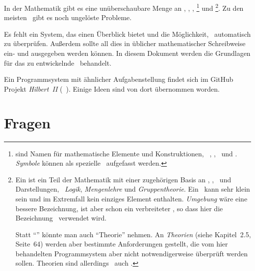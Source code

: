 In der Mathematik gibt es eine unüberschaubare Menge an \Axiomen, \Saetzen, \Beweisen, \emph{\Fachbegriffen}%
\footnote{%
	 sind Namen für mathematische Elemente und Konstruktionen, \textzB\ \Axiomen, \Saetze, \Beweise\ und \Fachgebiete.
	\emph{Symbole} können als spezielle \Fachbegriffe\ aufgefasst werden.
}
und \emph{\Fachgebieten}%
\footnote{%
	Ein  ist ein Teil der Mathematik mit einer zugehörigen Basis an \Axiomen, \Saetzen, \Fachbegriffen\ und Darstellungen, \textzB\ \emph{Logik}, \emph{Mengenlehre} und \emph{Gruppentheorie}.
	Ein \Fachgebiet\ kann sehr klein sein und im Extremfall kein einziges Element enthalten.
	\emph{Umgebung} wäre eine bessere Bezeichnung, ist aber schon ein verbreiteter \Fachbegriff, so dass hier die Bezeichnung \Fachgebiet\ verwendet wird.

	Statt \enquote{\Fachgebiet} könnte man auch \enquote{Theorie} nehmen.
	An \emph{Theorien} (siehe \cite{bib:Rautenberg} Kapitel~2.5, Seite~64) werden aber bestimmte Anforderungen gestellt, die vom hier behandelten Programmsystem aber nicht notwendigerweise überprüft werden sollen.
	Theorien sind allerdings \textiAlg\ auch \Fachgebiete.
}.
Zu den meisten \Fachgebieten\ gibt es noch ungelöste Probleme.

Es fehlt ein System, das einen Überblick bietet und die Möglichkeit, \Beweise\ automatisch zu überprüfen.
Außerdem sollte all dies in üblicher mathematischer Schreibweise ein- und ausgegeben werden können.
In diesem Dokument werden die Grundlagen für das zu entwickelnde \ASBA\ behandelt.

Ein Programmsystem mit ähnlicher Aufgabenstellung findet sich im GitHub Projekt \emph{Hilbert~II} (\seename~\cite{bib:HilbertII, bib:qedeq}).
Einige Ideen sind von dort übernommen worden.

\section{Fragen}%
\label{sec:Fragen}

